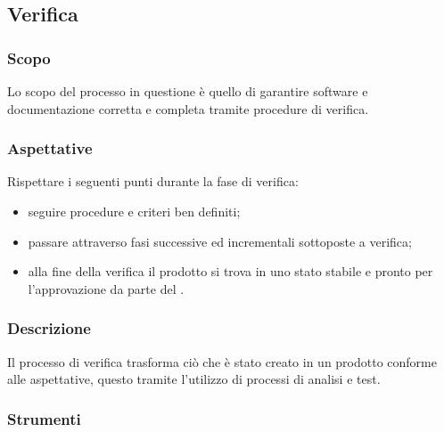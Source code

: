 \subsection{Verifica}\label{3.4}

\subsubsection{Scopo}\label{3.4.1}
Lo scopo del processo in questione è quello di garantire software e documentazione corretta e completa tramite procedure di verifica.

\subsubsection{Aspettative}
Rispettare i seguenti punti durante la fase di verifica:
\begin{itemize}
	\item seguire procedure e criteri ben definiti;
	\item passare attraverso fasi successive ed incrementali sottoposte a verifica;
	\item alla fine della verifica il prodotto si trova in uno stato stabile e pronto per l'approvazione da parte del \respProg. 
\end{itemize}

\subsubsection{Descrizione}
Il processo di verifica trasforma ciò che è stato creato in un prodotto conforme alle aspettative, questo tramite l'utilizzo di processi di analisi e test.



\subsubsection{Strumenti}

